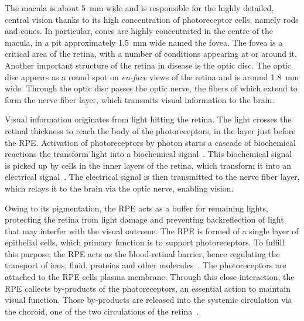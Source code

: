 \documentclass[12pt,a4paper]{journal}
\begin{document}
The macula is about \SI{5}{\mm} wide and is responsible for the highly detailed, central vision thanks to its high concentration of photoreceptor cells, namely rods and cones.
In particular, cones are highly concentrated in the centre of the macula, in a pit approximately \SI{1.5}{\mm} wide named the fovea.
The fovea is a critical area of the retina, with a number of conditions appearing at or around it.
\\
Another important structure of the retina in disease is the optic disc.
The optic disc appears as a round spot on \textit{en-face} views of the retina and is around \SI{1.8}{\mm} wide.
Through the optic disc passes the optic nerve, the fibers of which extend to form the nerve fiber layer, which transmits visual information to the brain.

Visual information originates from light hitting the retina.
The light crosses the retinal thickness to reach the body of the photoreceptors, in the layer just before the RPE.
Activation of photoreceptors by photon starts a cascade of biochemical reactions the transform light into a biochemical signal~\cite{Hurley2009}.
This biochemical signal is picked up by cells in the inner layers of the retina, which transform it into an electrical signal~\cite{Arslan2018}.
The electrical signal is then transmitted to the nerve fiber layer, which relays it to the brain via the optic nerve, enabling vision.

Owing to its pigmentation, the RPE acts as a buffer for remaining lights, protecting the retina from light damage and preventing backreflection of light that may interfer with the visual outcome.
The RPE is formed of a single layer of epithelial cells, which primary function is to support photoreceptors.
To fulfill this purpose, the RPE acts as the blood-retinal barrier, hence regulating the transport of ions, fluid, proteins and other molecules~\cite{Boulton2001}.
The photoreceptors are attached to the RPE cells plasma membrane.
Through this close interaction, the RPE collects by-products of the photoreceptors, an essential action to maintain visual function.
Those by-products are released into the systemic circulation via the choroid, one of the two circulations of the retina~\cite{Boulton2001}.
\end{document}
